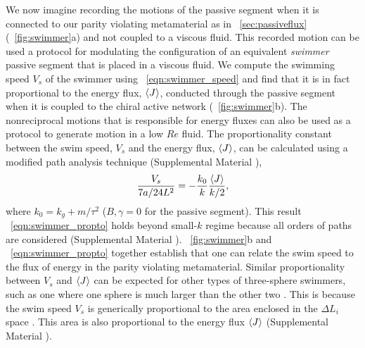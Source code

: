 \documentclass[
 preprint,
 preprintnumbers,
 amsmath,amssymb,
 aps,
 pre,
 longbibliography,
 superscriptaddress,
 10pt, twocolumn
]{revtex4-1}
\begin{document}
We now imagine recording the motions of the passive segment when it is connected to our parity violating metamaterial as in \secname~\ref{sec:passiveflux}(\figurename~\ref{fig:swimmer}a) and not coupled to a viscous fluid. This recorded motion can be used a protocol for modulating the configuration of an equivalent {\it swimmer} passive segment that is placed in a viscous fluid.
We compute the swimming speed $V_s$ of the swimmer using \eqnname~\ref{eqn:swimmer_speed} and find that it is in fact proportional to the energy flux, $\expval{J}$, conducted through the passive segment when it is coupled to the chiral active network (\figurename~\ref{fig:swimmer}b). The nonreciprocal motions that is responsible for energy fluxes can also be used as a protocol to generate motion in a low $Re$ fluid.
The proportionality constant between the swim speed, $V_s$ and the energy flux, $\expval{J}$, can be calculated using a modified path analysis technique (Supplemental Material \cite{SupplementalMaterial}),
\begin{equation} \label{eqn:swimmer_propto}
    \frac{V_s}{7a/24L^2} = -\frac{k_0}{k} \frac{\expval{J}}{k/2},
\end{equation}
where $k_0 = k_g + m/\tau^2$ ($B,\gamma=0$ for the passive segment).
This result \eqnname~\eqref{eqn:swimmer_propto} holds beyond small-$k$ regime because all orders of paths are considered (Supplemental Material \cite{SupplementalMaterial}).
\figurename~\ref{fig:swimmer}b and \eqnname~\eqref{eqn:swimmer_propto} together establish that one can relate the swim speed to the flux of energy in the parity violating metamaterial. 
Similar proportionality between $V_s$ and $\expval{J}$ can be expected for other types of three-sphere swimmers, such as one where one sphere is much larger than the other two \cite{Golestanian2008ThreesphereLowReynoldsnumber}. This is because the swim speed $V_s$ is generically proportional to the area enclosed in the $\Delta L_i$ space \cite{Golestanian2009StochasticLow}. This area is also proportional to the energy flux $\expval{J}$ (Supplemental Material \cite{SupplementalMaterial}).
\end{document}
